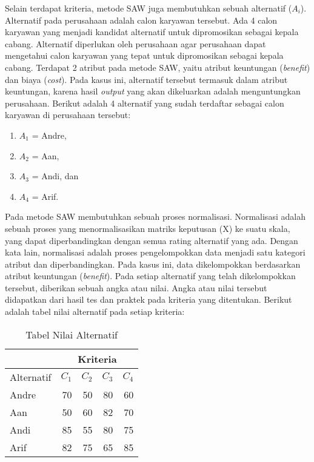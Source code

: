 Selain terdapat kriteria, metode SAW juga membutuhkan sebuah alternatif ($A_{i}$). Alternatif pada perusahaan adalah calon karyawan tersebut. Ada 4 calon karyawan yang menjadi kandidat alternatif untuk dipromosikan sebagai kepala cabang. Alternatif diperlukan oleh perusahaan agar perusahaan dapat mengetahui calon karyawan yang tepat untuk dipromosikan sebagai kepala cabang. Terdapat 2 atribut pada metode SAW, yaitu atribut keuntungan (\textit{benefit}) dan biaya (\textit{cost}). Pada kasus ini, alternatif tersebut termasuk dalam atribut keuntungan, karena hasil \textit{output} yang akan dikeluarkan adalah menguntungkan perusahaan. Berikut adalah 4 alternatif yang sudah terdaftar sebagai calon karyawan di perusahaan tersebut:
\begin{enumerate}
	\item $A_{1}$ = Andre,
	\item $A_{2}$ = Aan,
	\item $A_{3}$ = Andi, dan
	\item $A_{4}$ = Arif.
\end{enumerate}

Pada metode SAW membutuhkan sebuah proses normalisasi. Normalisasi adalah sebuah proses yang menormalisasikan matriks keputusan (X) ke suatu skala, yang dapat diperbandingkan dengan semua rating alternatif yang ada. Dengan kata lain, normalisasi adalah proses pengelompokkan data menjadi satu kategori atribut dan diperbandingkan. Pada kasus ini, data dikelompokkan berdasarkan atribut keuntungan (\textit{benefit}). Pada setiap alternatif yang telah dikelompokkan tersebut, diberikan sebuah angka atau nilai. Angka atau nilai tersebut didapatkan dari hasil tes dan praktek pada kriteria yang ditentukan. Berikut adalah tabel nilai alternatif pada setiap kriteria:


\begin{table}[H]
	\centering
	\caption{Tabel Nilai Alternatif}
		\begin{tabular}{|l|r|r|r|r|} \hline
    &
    \multicolumn{4}{|c|}{Kriteria} \\
		\hline
    Alternatif    & $C_{1}$ & $C_{2}$ & $C_{3}$ & $C_{4}$ \\
    \hline
    Andre      & 70&50&80    & 60      \\ \hline
       Aan   &    50&60&82&70      \\ \hline
    Andi       & 85&55&80&75      \\ \hline
    Arif       & 82&75&65&85     \\
    \hline
		
		\end{tabular}
	\label{table:nilaialternatif}
\end{table}


